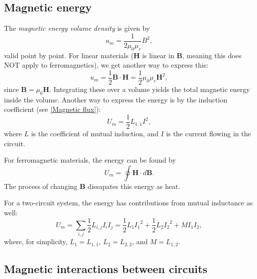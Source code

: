 \documentclass[a4paper, 12pt]{article}
\renewcommand{\vec}[1]{\mathbf{#1}}
\newcommand{\B}{\ensuremath{\vec{B}}}
\renewcommand{\H}{\ensuremath{\vec{H}}}
\begin{document}
    \subsection{Magnetic energy}
        The \textit{magnetic energy volume density} is given by
        \begin{equation}
            u_m = \frac{1}{2\mu_0\mu_r}B^2,
        \end{equation}
        valid point by point. 
        For linear materials (\H{} is linear in \B, meaning this does NOT apply to ferromagnetics), we get another way to express this: 
        \begin{equation}
            u_m = \frac{1}{2}\B\cdot\H = \frac{1}{2}\mu_0\mu_r\H^2,
        \end{equation}
        since $\B = \mu_0\H{}$. Integrating these over a volume yields the total magnetic energy inside the volume.
        Another way to express the energy is by the induction coefficient (see \ref{Magnetic flux}):
        \begin{equation}
            U_m = \frac{1}{2}L_{1,1}I^2,
        \end{equation}
        where $L$ is the coefficient of mutual induction, and $I$ is the current flowing in the circuit.

        For ferromagnetic materials, the energy can be found by
        \begin{equation}
            U_m = \oint \H \cdot d\B.
        \end{equation}
        The process of changing \B{} dissapates this energy as heat.

        For a two-circuit system, the energy has contributions from mutual inductance as well: 
        \begin{equation}
            U_m = \sum_{i,j}\frac{1}{2}L_{i,j}I_iI_j = \frac{1}{2}L_1{I_1}^2 + \frac{1}{2}L_2{I_2}^2 + MI_1I_2,
        \end{equation}
        where, for simplicity, $L_1 = L_{1,1},\, L_2 = L_{2,2}$, and $M = L_{1,2}$.
    
    \subsection{Magnetic interactions between circuits}
\end{document}

